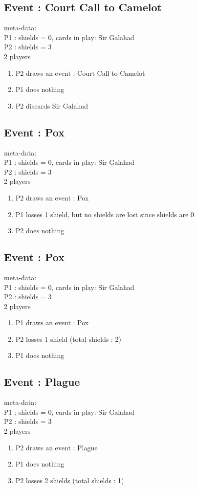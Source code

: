 \documentclass[a4paper,11pt]{article}
\begin{document}
\subsection{Event : Court Call to Camelot}
meta-data:\\
P1 : shields = 0, cards in play: Sir Galahad\\
P2 : shields = 3\\
2 players\\
\begin{enumerate}
	\item P2 draws an event : Court Call to Camelot
	\item P1 does nothing
	\item P2 discards Sir Galahad
\end{enumerate}

\subsection{Event : Pox}
meta-data:\\
P1 : shields = 0, cards in play: Sir Galahad\\
P2 : shields = 3\\
2 players\\
\begin{enumerate}
	\item P2 draws an event : Pox
	\item P1 losses 1 shield, but no shields are lost since shields are 0
	\item P2 does nothing
\end{enumerate}


\subsection{Event : Pox}
meta-data:\\
P1 : shields = 0, cards in play: Sir Galahad\\
P2 : shields = 3\\
2 players\\
\begin{enumerate}
	\item P1 draws an event : Pox
	\item P2 losses 1 shield (total shields : 2)
	\item P1 does nothing
\end{enumerate}


\subsection{Event : Plague}
meta-data:\\
P1 : shields = 0, cards in play: Sir Galahad\\
P2 : shields = 3\\
2 players\\
\begin{enumerate}
	\item P2 draws an event : Plague 
	\item P1 does nothing
	\item P2 losses 2 shields (total shields : 1)
\end{enumerate}
\end{document}
